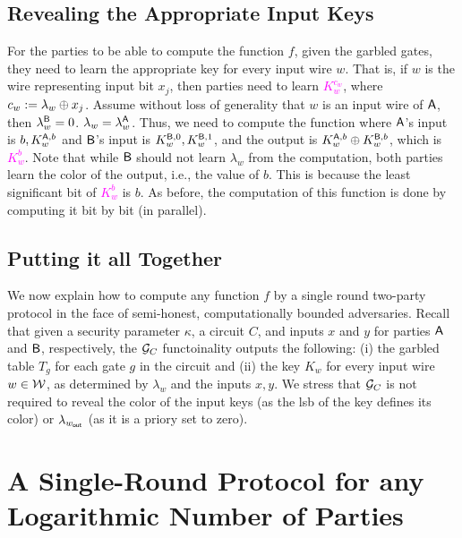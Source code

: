 \subsection{Revealing the Appropriate Input Keys}
For the parties to be able to compute the function $f$, given the garbled gates, they need to learn the appropriate key for every input wire $w$. That is, if $w$ is the wire representing input bit $x_j$, then parties need to learn \textcolor{magenta}{$K_w^{c_w}$}, where $c_w := \lambda_w\oplus x_j$. Assume without loss of generality that $w$ is an input wire of $\mathsf{A}$, then $\lambda_{w}^{\mathsf{B}} =0$. \ie $\lambda_{w}=\lambda_{w}^{\mathsf{A}}$. Thus, we need to compute the function where $\mathsf{A}$'s input is $b,K_w^{\mathsf{A},b}$ and $\mathsf{B}$'s input is $K_w^{\mathsf{B},0}, K_w^{\mathsf{B},1}$, and the output is $K_w^{\mathsf{A},b}\oplus K_w^{\mathsf{B},b}$, which is \textcolor{magenta}{$K_w^b$}. Note that while $\mathsf{B}$ should not learn $\lambda_{w}$ from the computation, both parties learn the color of the output, i.e., the value of $b$. This is because the least significant bit of \textcolor{magenta}{$K_w^b$} is $b$. As before, the computation of this function is done by computing it bit by bit (in parallel).

\subsection{Putting it all Together}
We now explain how to compute any function $f$ by a single round two-party protocol in the face of semi-honest, computationally bounded adversaries. Recall that given a security parameter $\kappa$, a circuit $C$, and inputs $x$ and $y$ for parties $\mathsf{A}$ and $\mathsf{B}$, respectively,   the ${\mathcal{G}}_{C}$ functoinality outputs the following: (i) the garbled table $T_g$ for each gate $g$ in the circuit and (ii) the key $K_w$ for every input wire $w\in{\cal W}$, as determined by $\lambda_w$ and the inputs $x,y$. We stress that ${\mathcal{G}}_{C}$ is not required to reveal the color of the input keys (as the lsb of the key defines its color) or $\lambda_{w_{\mathsf{out}}}$ (as it is a priory set to zero).  


\section{A Single-Round Protocol for any  Logarithmic Number of Parties}

